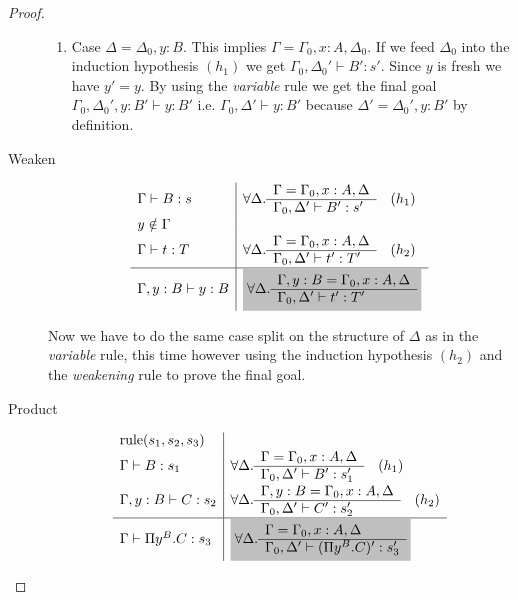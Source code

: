 \begin{theorem}
\begin{proof}
\begin{description}
\begin{enumerate}
      \item Case $\Delta = \Delta_0,y:B$. This implies
        $\Gamma = \Gamma_0,x:A,\Delta_0$. If we feed $\Delta_0$ into the
        induction hypothesis $(h_1)$ we get
        $ \Gamma_0,\Delta_0' \vdash B': s'$. Since $y$ is fresh we have
        $y' = y$. By using the \emph{variable} rule we get the final goal
        $\Gamma_0,\Delta_0',y:B' \vdash y:B'$ i.e.
        $\Gamma_0,\Delta' \vdash y:B'$ because $\Delta' = \Delta_0',y:B'$ by
        definition.

      \end{enumerate}


    \item[Weaken]
      $$
      \begin{array}{l|l}
        \Gamma \vdash B:s
        & \forall \Delta .
          \rulev
          {\Gamma = \Gamma_0,x:A,\Delta}
          {\Gamma_0,\Delta' \vdash B' : s'} \quad(h_1)
        \\
        y \notin \Gamma
        \\
        \Gamma \vdash t:T
        & \forall \Delta .
          \rulev
          {\Gamma = \Gamma_0,x:A,\Delta}
          {\Gamma_0,\Delta' \vdash t': T'} \quad (h_2)
        \\
        \hline %
        \Gamma,y:B \vdash y:B
        & \goalbg{
          \forall \Delta .
          \rulev
          {\Gamma,y:B = \Gamma_0,x:A,\Delta}
          {\Gamma_0,\Delta' \vdash t': T'}
          }
      \end{array}
      $$

      Now we have to do the same case split on the structure of $\Delta$ as in
      the \emph{variable} rule, this time however using the induction
      hypothesis $(h_2)$ and the \emph{weakening} rule to prove the final
      goal.

    \item[Product]
      $$
      \begin{array}{l|l}
        \text{rule}(s_1,s_2,s_3)
        \\
        \Gamma \vdash B:s_1
        & \forall \Delta .
          \rulev
          {\Gamma = \Gamma_0,x:A,\Delta}
          {\Gamma_0,\Delta' \vdash B': s_1'} \quad (h_1)
        \\
        \Gamma,y:B \vdash C:s_2
        &  \forall \Delta .
          \rulev
          {\Gamma,y:B = \Gamma_0,x:A,\Delta}
          {\Gamma_0,\Delta' \vdash C': s_2'} \quad (h_2)
        \\
        \hline
        \Gamma \vdash \Pi y^B . C: s_3
        & \goalbg{
          \forall \Delta .
          \rulev
          {\Gamma = \Gamma_0,x:A,\Delta}
          {\Gamma_0,\Delta' \vdash (\Pi y^B. C)' : s_3'}
          }
      \end{array}
      $$


\end{description}
\end{proof}
\end{theorem}

